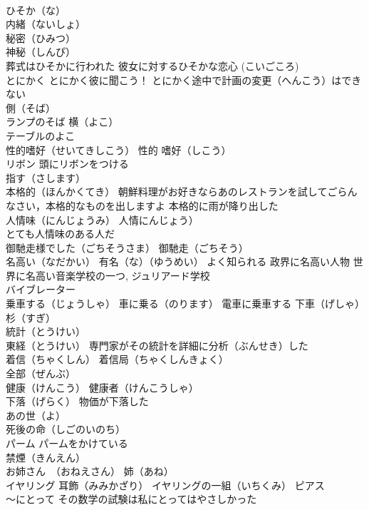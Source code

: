 \documentclass[8pt]{extreport}
\begin{document}
\begin{CJK}{UTF8}{min}
\\	ひそか（な）
\\	内緒（ないしょ）
\\	秘密（ひみつ）
\\	神秘（しんぴ）
\\	葬式はひそかに行われた 彼女に対するひそかな恋心 (こいごころ)
\\	とにかく とにかく彼に聞こう！ とにかく途中で計画の変更（へんこう）はできない
\\	側（そば）
\\	ランプのそば 横（よこ）
\\	テーブルのよこ
\\	性的嗜好（せいてきしこう） 性的 嗜好（しこう）
\\	リボン 頭にリボンをつける
\\	指す（さします）
\\	本格的（ほんかくてき） 朝鮮料理がお好きならあのレストランを試してごらんなさい，本格的なものを出しますよ 本格的に雨が降り出した
\\	人情味（にんじょうみ） 人情にんじょう）
\\	とても人情味のある人だ
\\	御馳走様でした（ごちそうさま） 御馳走（ごちそう）
\\	名高い（なだかい） 有名（な）（ゆうめい） よく知られる 政界に名高い人物 世界に名高い音楽学校の一つ, ジュリアード学校
\\	バイブレーター
\\	乗車する（じょうしゃ） 車に乗る（のります） 電車に乗車する 下車（げしゃ）
\\	杉（すぎ）
\\	統計（とうけい） 
\\	東経（とうけい） 専門家がその統計を詳細に分析（ぶんせき）した
\\	着信（ちゃくしん） 着信局（ちゃくしんきょく）
\\	全部（ぜんぶ）
\\	健康（けんこう） 健康者（けんこうしゃ）
\\	下落（げらく） 物価が下落した
\\	あの世（よ）
\\	死後の命（しごのいのち）
\\	パーム パームをかけている
\\	禁煙（きんえん）
\\	お姉さん　（おねえさん） 姉（あね）
\\	イヤリング 耳飾（みみかざり） イヤリングの一組（いちくみ） ピアス
\\	～にとって その数学の試験は私にとってはやさしかった

\end{CJK}
\end{document}
